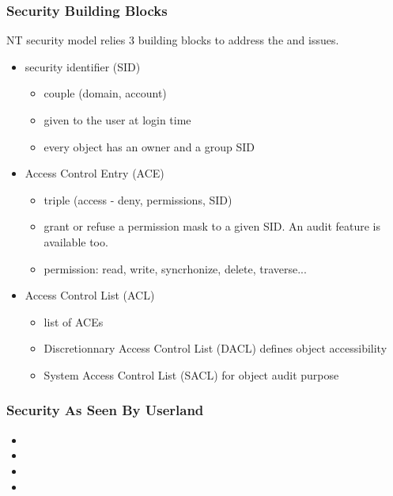 
\begin{frame}
  \frametitle{Security Building Blocks}

  NT security model relies 3 building blocks to address the
   and  issues.

  \begin{itemize}

    \item
      security identifier (SID)
      \begin{itemize}
      \item
        couple (domain, account)
      \item
        given to the user at login time
      \item
        every object has an owner and a group SID
      \end{itemize}

    \item
      Access Control Entry (ACE)
      \begin{itemize}
        \item
          triple (access - deny, permissions, SID)
        \item
          grant or refuse a permission mask to a given SID. An audit feature is available too.
        \item
          permission: read, write, syncrhonize, delete, traverse...
      \end{itemize}

    \item
      Access Control List (ACL)
      \begin{itemize}
        \item
          list of ACEs
        \item
          Discretionnary Access Control List (DACL) defines object accessibility
        \item
          System Access Control List (SACL) for object audit purpose
      \end{itemize}

  \end{itemize}

\end{frame}


\begin{frame}[containsverbatim]
  \frametitle{Security As Seen By Userland}

  \begin{itemize}
    \item
    \item
    \item
    \item
  \end{itemize}

\end{frame}

